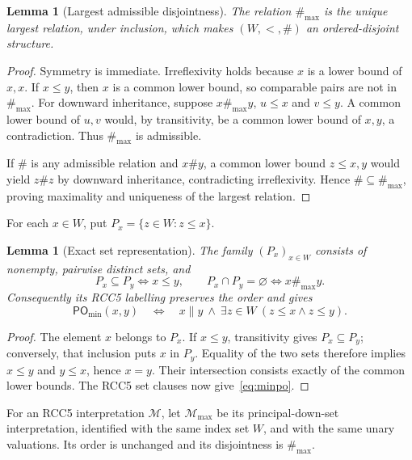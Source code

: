 \documentclass[11pt,letterpaper]{article}
\newcommand{\PO}{\mathsf{PO}}
\newcommand{\inc}{\mathrel{\|}}
\newtheorem{lemma}[theorem]{Lemma}
\theoremstyle{definition}
\theoremstyle{remark}
\begin{document}
\begin{lemma}[Largest admissible disjointness]
\label{lem:maxdr}
The relation $\#_{\max}$ is the unique largest relation, under inclusion,
which makes $(W,<,\#)$ an ordered-disjoint structure.
\end{lemma}
\begin{proof}
Symmetry is immediate. Irreflexivity holds because $x$ is a lower bound
of $x,x$. If $x\leq y$, then $x$ is a common lower bound, so comparable
pairs are not in $\#_{\max}$. For downward inheritance, suppose
$x\#_{\max}y$, $u\leq x$ and $v\leq y$. A common lower bound of $u,v$
would, by transitivity, be a common lower bound of $x,y$, a contradiction.
Thus $\#_{\max}$ is admissible.

If $\#$ is any admissible relation and $x\#y$, a common lower bound
$z\leq x,y$ would yield $z\#z$ by downward inheritance, contradicting
irreflexivity. Hence $\#\subseteq\#_{\max}$, proving maximality and
uniqueness of the largest relation.
\end{proof}

For each $x\in W$, put $P_x=\{z\in W:z\leq x\}$.

\begin{lemma}[Exact set representation]
\label{lem:principal}
The family $(P_x)_{x\in W}$ consists of nonempty, pairwise distinct sets,
and
\[
P_x\subseteq P_y\iff x\leq y,
\qquad
P_x\cap P_y=\varnothing\iff x\#_{\max}y.
\]
Consequently its RCC5 labelling preserves the order and gives
\begin{equation}
\PO_{\min}(x,y)
\quad\Longleftrightarrow\quad
x\inc y\ \land\ \exists z\in W\ (z\leq x\land z\leq y).
\label{eq:minpo}
\end{equation}
\end{lemma}
\begin{proof}
The element $x$ belongs to $P_x$. If $x\leq y$, transitivity gives
$P_x\subseteq P_y$; conversely, that inclusion puts $x$ in $P_y$.
Equality of the two sets therefore implies $x\leq y$ and $y\leq x$,
hence $x=y$. Their intersection consists exactly of the common lower
bounds. The RCC5 set clauses now give~\eqref{eq:minpo}.
\end{proof}

For an RCC5 interpretation $\mathcal M$, let $\mathcal M_{\max}$ be its
principal-down-set interpretation, identified with the same index set $W$,
and with the same unary valuations. Its order is unchanged and its
disjointness is $\#_{\max}$.
\end{document}
